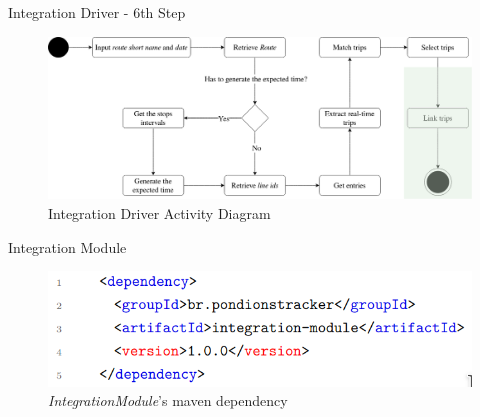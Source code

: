 \documentclass[xcolor=dvipsnames,table]{beamer}
\begin{document}
\begin{frame}{Integration Driver - 6th Step}
        \begin{figure}[H]
                \centering
                \includegraphics[width = \textwidth]{images/integrationDriverAD(6th_step).png}
                \caption{Integration Driver Activity Diagram}
        \end{figure}
\end{frame}
\begin{frame}{Integration Module}
        \begin{figure}[H]
                \centering
                \includegraphics[scale=0.45]{images/mdIntegrationModule.png}
                \caption{\textit{IntegrationModule}'s maven dependency}
        \end{figure}
\end{frame}
\end{document}
